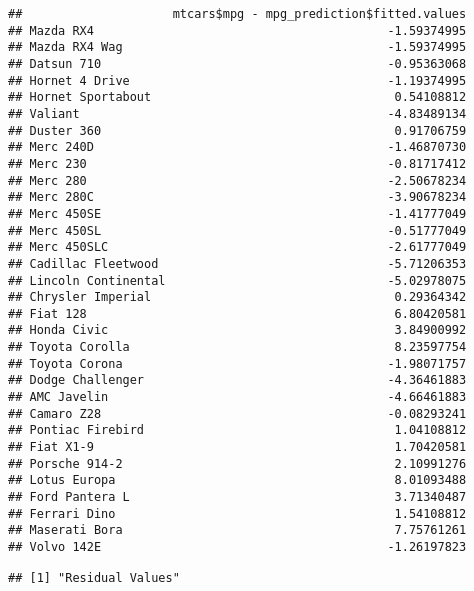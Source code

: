 \documentclass[
]{book}
\theoremstyle{definition}
\theoremstyle{definition}
\theoremstyle{definition}
\theoremstyle{definition}
\theoremstyle{remark}
\begin{document}
\begin{verbatim}
##                     mtcars$mpg - mpg_prediction$fitted.values
## Mazda RX4                                         -1.59374995
## Mazda RX4 Wag                                     -1.59374995
## Datsun 710                                        -0.95363068
## Hornet 4 Drive                                    -1.19374995
## Hornet Sportabout                                  0.54108812
## Valiant                                           -4.83489134
## Duster 360                                         0.91706759
## Merc 240D                                         -1.46870730
## Merc 230                                          -0.81717412
## Merc 280                                          -2.50678234
## Merc 280C                                         -3.90678234
## Merc 450SE                                        -1.41777049
## Merc 450SL                                        -0.51777049
## Merc 450SLC                                       -2.61777049
## Cadillac Fleetwood                                -5.71206353
## Lincoln Continental                               -5.02978075
## Chrysler Imperial                                  0.29364342
## Fiat 128                                           6.80420581
## Honda Civic                                        3.84900992
## Toyota Corolla                                     8.23597754
## Toyota Corona                                     -1.98071757
## Dodge Challenger                                  -4.36461883
## AMC Javelin                                       -4.66461883
## Camaro Z28                                        -0.08293241
## Pontiac Firebird                                   1.04108812
## Fiat X1-9                                          1.70420581
## Porsche 914-2                                      2.10991276
## Lotus Europa                                       8.01093488
## Ford Pantera L                                     3.71340487
## Ferrari Dino                                       1.54108812
## Maserati Bora                                      7.75761261
## Volvo 142E                                        -1.26197823
\end{verbatim}

\begin{verbatim}
## [1] "Residual Values"
\end{verbatim}
\end{document}
